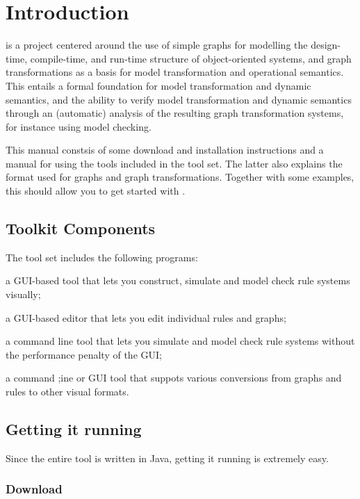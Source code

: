 \section{Introduction}

\GROOVE is a project centered around the use of simple graphs for
modelling the design-time, compile-time, and run-time structure of
object-oriented systems, and graph transformations as a basis for
model transformation and operational semantics. This entails a formal
foundation for  model transformation and dynamic semantics, and the
ability to verify model transformation and dynamic semantics through
an (automatic) analysis of the resulting graph transformation systems,
for instance using model checking.

This manual constsis of some download and installation instructions and a
manual for using the tools included in the \GROOVE tool set. The latter also
explains the format used for graphs and graph transformations. Together
with some examples, this should allow you to get started with \GROOVE.

\subsection{Toolkit Components}

The \GROOVE tool set includes the following programs:
\begin{description}\noitemsep
\item[Simulator:] a GUI-based tool that lets you construct, simulate and
  model check rule systems visually;
\item[Editor:] a GUI-based editor that lets you edit individual rules and
  graphs;
\item[Generator:] a command line tool that lets you simulate and model check
  rule systems without the performance penalty of the GUI;
\item[Imager:] a command ;ine or GUI tool that suppots various conversions from
  \GROOVE graphs and rules to other visual formats.
\end{description}

\subsection{Getting it running}

Since the entire \GROOVE tool is written in Java, getting it running is
extremely easy.

\subsubsection{Download}

